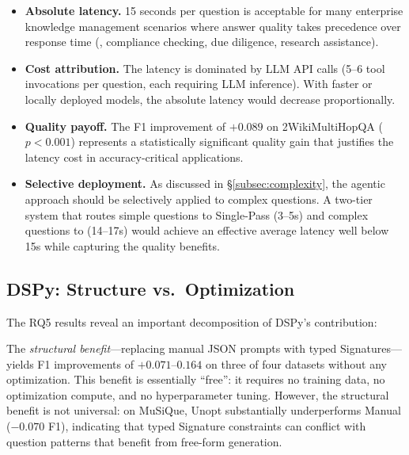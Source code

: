\begin{itemize}
    \item \textbf{Absolute latency.} 15 seconds per question is acceptable for many enterprise knowledge management scenarios where answer quality takes precedence over response time (\eg, compliance checking, due diligence, research assistance).

    \item \textbf{Cost attribution.} The latency is dominated by LLM API calls (5--6 tool invocations per question, each requiring LLM inference). With faster or locally deployed models, the absolute latency would decrease proportionally.

    \item \textbf{Quality payoff.} The F1 improvement of $+0.089$ on 2WikiMultiHopQA ($p < 0.001$) represents a statistically significant quality gain that justifies the latency cost in accuracy-critical applications.

    \item \textbf{Selective deployment.} As discussed in \S\ref{subsec:complexity}, the agentic approach should be selectively applied to complex questions.
    A two-tier system that routes simple questions to Single-Pass (3--5s) and complex questions to \ours{} (14--17s) would achieve an effective average latency well below 15s while capturing the quality benefits.
\end{itemize}

\subsection{DSPy: Structure vs.\ Optimization}
\label{subsec:dspy_discussion}

The RQ5 results reveal an important decomposition of DSPy's contribution:

The \emph{structural benefit}---replacing manual JSON prompts with typed Signatures---yields F1 improvements of $+0.071$--$0.164$ on three of four datasets without any optimization.
This benefit is essentially ``free'': it requires no training data, no optimization compute, and no hyperparameter tuning.
However, the structural benefit is not universal: on MuSiQue, Unopt substantially underperforms Manual ($-0.070$ F1), indicating that typed Signature constraints can conflict with question patterns that benefit from free-form generation.

